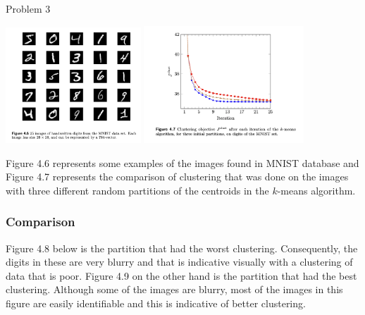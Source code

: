 \begin{problem}{Problem 3}
\begin{Highlight}[Solution]
        \begin{center}
            \includegraphics[width = 0.38\textwidth]{./Images/Figure 4.6.png}
            \hspace*{20pt}
            \includegraphics[width = 0.45\textwidth]{./Images/Figure 4.7.png}
        \end{center}
        Figure 4.6 represents some examples of the images found in MNIST database and Figure 4.7 represents the comparison of clustering that was done on the images with three different random partitions
        of the centroids in the $k$-means algorithm. \vspace*{1em}

        \subsubsection*{Comparison}

        Figure 4.8 below is the partition that had the worst clustering. Consequently, the digits in these are very blurry and that is indicative visually with a clustering of data that is poor. Figure 
        4.9 on the other hand is the partition that had the best clustering. Although some of the images are blurry, most of the images in this figure are easily identifiable and this is indicative of 
        better clustering. \vspace*{1em}
        

\end{Highlight}
\end{problem}
